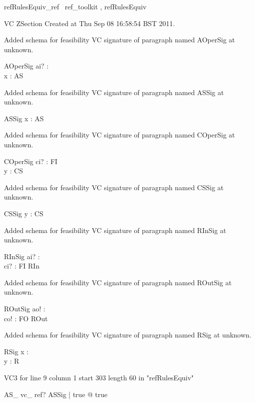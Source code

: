 \documentclass{article}
\begin{document}

\begin{zsection}	 \SECTION refRulesEquiv\_ref \parents~ref\_toolkit , refRulesEquiv
\end{zsection}

VC ZSection Created at Thu Sep 08 16:58:54 BST 2011.


Added schema for feasibility VC signature of paragraph named AOperSig at unknown.
\begin{schema}{AOperSig}
ai? : \nat \\
 x : \power \nat 
\where
 AS
\end{schema}


Added schema for feasibility VC signature of paragraph named ASSig at unknown.
\begin{schema}{ASSig}
x : \power \nat 
\where
 AS
\end{schema}


Added schema for feasibility VC signature of paragraph named COperSig at unknown.
\begin{schema}{COperSig}
ci? : FI \\
 y : \seq \nat 
\where
 CS
\end{schema}


Added schema for feasibility VC signature of paragraph named CSSig at unknown.
\begin{schema}{CSSig}
y : \seq \nat 
\where
 CS
\end{schema}


Added schema for feasibility VC signature of paragraph named RInSig at unknown.
\begin{schema}{RInSig}
ai? : \nat \\
 ci? : FI 
\where
 RIn
\end{schema}


Added schema for feasibility VC signature of paragraph named ROutSig at unknown.
\begin{schema}{ROutSig}
ao! : \nat \\
 co! : FO 
\where
 ROut
\end{schema}


Added schema for feasibility VC signature of paragraph named RSig at unknown.
\begin{schema}{RSig}
x : \power \nat \\
 y : \seq \nat 
\where
 R
\end{schema}

VC3 for line 9 column 1 start 303 length 60 in "refRulesEquiv"
\begin{theorem}{AS\_ vc\_ ref}\vdash ? \exists ASSig | true @ true
\end{theorem}
\end{document}
